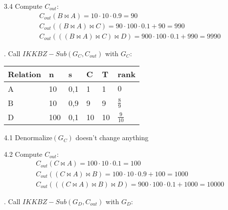 \documentclass{article}
\begin{document}
3.4 Compute $C_{out}$:
\begin{align}
& C_{out}(B \bowtie A) = 10 \cdot 10 \cdot 0.9 = 90 \nonumber \\
& C_{out}((B \bowtie A) \bowtie C) = 90 \cdot 100 \cdot 0.1 + 90 = 990 \nonumber \\
& C_{out}(((B \bowtie A) \bowtie C) \bowtie D) = 900 \cdot 100 \cdot 0.1 + 990 = 9990 \nonumber
\end{align}





. Call $IKKBZ-Sub(G_C,C_{out})$ with $G_C:$


\begin{table}[!hbtp]
\begin{tabular}{|l|l|l|l|l|l|}
\hline
Relation & n   & s   & C  & T  & rank           \\ \hline
A        & 10  & 0,1 & 1  & 1  & $0$  \\ \hline
B        & 10  & 0,9 & 9  & 9  & $\frac{8}{9}$  \\ \hline
D        & 100 & 0,1 & 10 & 10 & $\frac{9}{10}$ \\ \hline
\end{tabular}
\end{table}

\vspace*{1cm}
4.1 Denormalize$(G_C)$ doesn't change anything

4.2 Compute $C_{out}$:
\begin{align}
& C_{out}(C \bowtie A) = 100 \cdot 10 \cdot 0.1 = 100 \nonumber \\
& C_{out}((C \bowtie A) \bowtie B) = 100 \cdot 10 \cdot 0.9 + 100 = 1000 \nonumber \\
& C_{out}(((C \bowtie A) \bowtie B) \bowtie D) = 900 \cdot 100 \cdot 0.1 + 1000 = 10000 \nonumber
\end{align}




. Call $IKKBZ-Sub(G_D,C_{out})$ with $G_D:$

\end{document}
